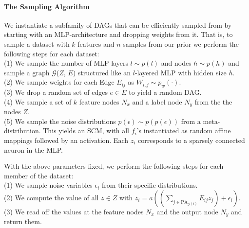 \documentclass{article}
\begin{document}
\paragraph{The Sampling Algorithm}
We instantiate a subfamily of DAGs that can be efficiently sampled from by starting with an MLP-architecture and dropping weights from it.
That is, to sample a dataset with $k$ features and $n$ samples from our prior we perform the following steps for each dataset: \\
\hphantom{~~~~}(1) We sample the number of MLP layers $l \sim p(l)$ and nodes $h \sim p(h)$ and sample a graph $\mathcal{G}$($Z$, $E$) structured like an $l$-layered MLP with hidden size $h$.\\%
\hphantom{~~~~}(2) We sample weights for each Edge $E_{ij}$%
as $W_{i,j} \sim p_w(\cdot)$.\\
\hphantom{~~~~}(3) We drop a random set of edges $e \in E$ to yield a random DAG.\\
\hphantom{~~~~}(4) We sample a set of $k$ feature nodes $N_x$  and a label node $N_y$ from the the nodes $Z$.\\
\hphantom{~~~~}(5) We sample the noise distributions $p(\epsilon) \sim p(p(\epsilon))$ from a meta-distribution.%
This yields an SCM, with all $f_i$'s instantiated as random affine mappings followed by an activation. Each $z_i$ corresponds to a sparsely connected neuron in the MLP.

With the above parameters fixed, we perform the following steps for each member of the dataset:\\
\hphantom{~~~~}(1) We sample noise variables $\epsilon_i$ from their specific distributions.\\
\hphantom{~~~~}(2) We compute the value of all $z \in Z$ with $z_i = a((\sum_{j \in \text{PA}_{\mathcal{G}(i)}} E_{ij} z_j) + \epsilon_i)$.\\
\hphantom{~~~~}(3) We read off the values at the feature nodes $N_x$ and the output node $N_y$ and return them.
\end{document}
